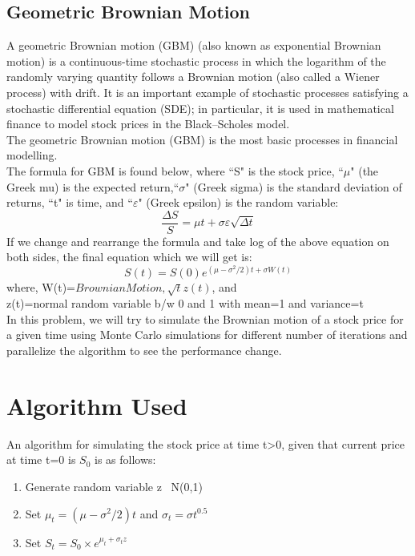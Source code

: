 \documentclass[10pt,a4paper]{article}
\begin{document}
\subsection{Geometric Brownian Motion}
A geometric Brownian motion (GBM) (also known as exponential Brownian motion) is a continuous-time stochastic process in which the logarithm of the randomly varying quantity follows a Brownian motion (also called a Wiener process) with drift. It is an important example of stochastic processes satisfying a stochastic differential equation (SDE); in particular, it is used in mathematical finance to model stock prices in the Black–Scholes model.\\
The geometric Brownian motion (GBM) is the most basic processes in financial modelling.\\
The formula for GBM is found below, where ``S" is the stock price, ``$\mu$" (the Greek mu) is the expected return,``$\sigma$" (Greek sigma) is the standard deviation of returns, ``t" is time, and ``$\varepsilon$" (Greek epsilon) is the random variable:\\
\begin{equation}
\frac{\Delta S}{S}=\mu t + \sigma \varepsilon \sqrt{\Delta t}
\end{equation}
If we change and rearrange the formula and take log of the above equation on both sides, the final equation which we will get is:\\
\begin{equation}
S(t)=S(0)e^{(\mu - \sigma ^{2}/2)t + \sigma W(t)}
\end{equation}
where,
W(t)=$Brownian Motion, \sqrt{t} z(t) $, and \\
z(t)=normal random variable b/w 0 and 1 with mean=1 and variance=t\\
In this problem, we will try to simulate the Brownian motion of a stock price for a given time using Monte Carlo simulations for different number of iterations and parallelize the algorithm to see the performance change.
\section{Algorithm Used}
An algorithm for simulating the stock price at time t>0, given that current price at time t=0 is $S_{0}$ is as follows:\\
\begin{enumerate}
\item Generate random variable z ~N(0,1)
\item Set $\mu_{t}=(\mu - \sigma^{2}/2)t$ and $\sigma_{t}=\sigma t^{0.5}$
\item Set $S_{t}=S_{0} \times e^{\mu_{t} + \sigma_{t} z}$
\end{enumerate}
\end{document}
